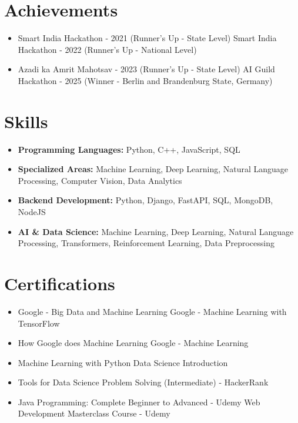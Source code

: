 \documentclass[a4paper,10pt]{article}
\begin{document}
\section*{Achievements}
\begin{itemize}
\item Smart India Hackathon - 2021 (Runner's Up - State Level) \hfill Smart India Hackathon - 2022 (Runner's Up - National Level)
\item Azadi ka Amrit Mahotsav - 2023 (Runner's Up - State Level) \hfill AI Guild Hackathon - 2025 (Winner - Berlin and Brandenburg State, Germany)
\end{itemize}

\section*{Skills}
\begin{itemize}
  \item \textbf{Programming Languages:} Python, C++, JavaScript, SQL
  \item \textbf{Specialized Areas:} Machine Learning, Deep Learning, Natural Language Processing, Computer Vision, Data Analytics
  \item \textbf{Backend Development:} Python, Django, FastAPI, SQL, MongoDB, NodeJS
  \item \textbf{AI \& Data Science:} Machine Learning, Deep Learning, Natural Language Processing, Transformers, Reinforcement Learning, Data Preprocessing
\end{itemize}

\section*{Certifications}
\begin{itemize}
\item Google - Big Data and Machine Learning \hfill Google - Machine Learning with TensorFlow
\item How Google does Machine Learning \hfill Google - Machine Learning
\item Machine Learning with Python \hfill Data Science Introduction
\item Tools for Data Science \hfill Problem Solving (Intermediate) - HackerRank
\item Java Programming: Complete Beginner to Advanced - Udemy \hfill Web Development Masterclass Course - Udemy
\end{itemize}
\end{document}
